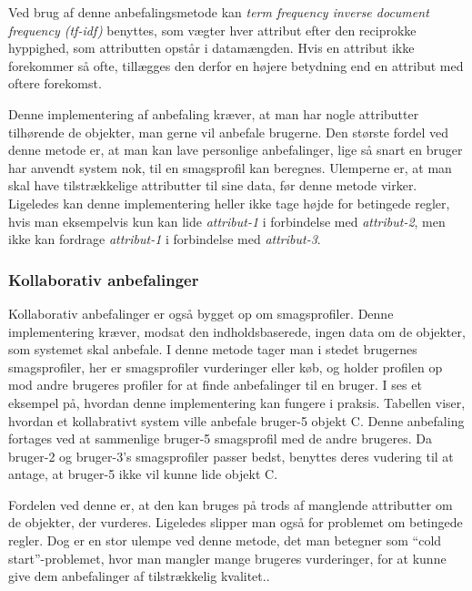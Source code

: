 Ved brug af denne anbefalingsmetode kan \textit{term frequency inverse document frequency (tf-idf)} benyttes, som vægter hver attribut efter den reciprokke hyppighed, som attributten opstår i datamængden.
Hvis en attribut ikke forekommer så ofte, tillægges den derfor en højere betydning end en attribut med oftere forekomst.

Denne implementering af anbefaling kræver, at man har nogle attributter tilhørende de objekter, man gerne vil anbefale brugerne.
Den største fordel ved denne metode er, at man kan lave personlige anbefalinger, lige så snart en bruger har anvendt system nok, til en smagsprofil kan beregnes.
Ulemperne er, at man skal have tilstrækkelige attributter til sine data, før denne metode virker. 
Ligeledes kan denne implementering heller ikke tage højde for betingede regler, hvis man eksempelvis kun kan lide \textit{attribut-1} i forbindelse med \textit{attribut-2}, men ikke kan fordrage \textit{attribut-1} i forbindelse med \textit{attribut-3}.

\subsubsection{Kollaborativ anbefalinger}
Kollaborativ anbefalinger er også bygget op om smagsprofiler.
Denne implementering kræver, modsat den indholdsbaserede, ingen data om de objekter, som systemet skal anbefale. 
I denne metode tager man i stedet brugernes smagsprofiler, her er smagsprofiler vurderinger eller køb, og holder profilen op mod andre brugeres profiler for at finde anbefalinger til en bruger.
I  ses et eksempel på, hvordan denne implementering kan fungere i praksis.
Tabellen viser, hvordan et kollabrativt system ville anbefale bruger-5 objekt C.
Denne anbefaling fortages ved at sammenlige bruger-5 smagsprofil med de andre brugeres.
Da bruger-2 og bruger-3's smagsprofiler passer bedst, benyttes deres vudering til at antage, at bruger-5 ikke vil kunne lide objekt C.
\citep{kollabrativEksempel}

Fordelen ved denne er, at den kan bruges på trods af manglende attributter om de objekter, der vurderes.
Ligeledes slipper man også for problemet om betingede regler.
Dog er en stor ulempe ved denne metode, det man betegner som ``cold start''-problemet, hvor man mangler mange brugeres vurderinger, for at kunne give dem anbefalinger af tilstrækkelig kvalitet.\citep{RecommenderSystems}.


